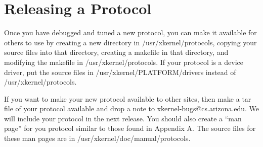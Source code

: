 %
%

\section{Releasing a Protocol}

Once you have debugged and tuned a new protocol, you can make it
available for others to use by creating a new directory in {\sanss
/usr/xkernel/protocols}, copying your source files into that
directory, creating a makefile in that directory, and modifying the
makefile in {\sanss /usr/xkernel/protocols}.  If your protocol is a
device driver, put the source files in {\sanss
/usr/xkernel/PLATFORM/drivers} instead of {\sanss
/usr/xkernel/protocols}.

If you want to make your new protocol available to other sites, then
make a tar file of your protocol available and drop a note to {\sanss
xkernel-bugs@cs.arizona.edu}.  We will include your protocol in the
next release. You should also create a ``man page'' for you protocol
similar to those found in Appendix A. The source files for these
man pages are in {\sanss /usr/xkernel/doc/manual/protocols}.

